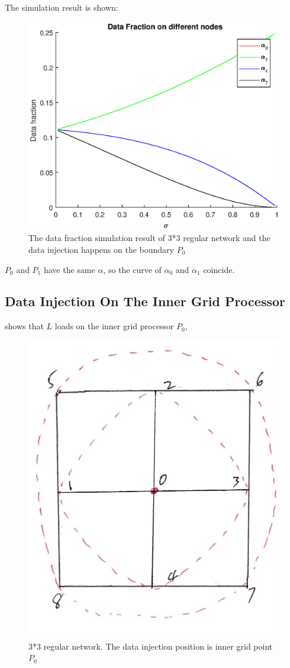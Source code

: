 The simulation result is shown:
\begin{figure}[!ht]
\centering
\includegraphics[width=1\columnwidth]{figure/3t3bfraction.eps}
\caption{The data fraction simulation result of 3*3 regular network and the data injection happens on the boundary $P_{0}$}
\label{fig:3t3bfraction}
\end{figure}
$P_{0}$ and $P_{1}$ have the same $\alpha$, so the curve of $\alpha_{0}$ and $\alpha_{1}$ coincide.  
\newpage 
\subsection{Data Injection On The Inner Grid Processor}

 shows that $L$ loads on the inner grid processor $P_{0}$, 
\begin{figure}[!ht]
\centering
\includegraphics[width=0.5\columnwidth]{figure/3t3i.JPG}
\caption{3*3 regular network.  The data injection position is inner grid point $P_{0}$}
\label{fig:3t3i}
\end{figure}
\newpage

